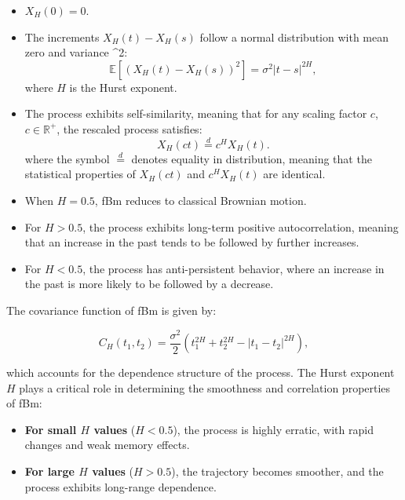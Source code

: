 \documentclass[11pt]{extarticle}
\begin{document}
\begin{itemize}
    \item \( X_H(0) = 0 \).
    \item The increments \( X_H(t) - X_H(s) \) follow a normal distribution with mean zero and variance \sigma^2:
    \begin{equation}
        \mathbb{E} \left[ (X_H(t) - X_H(s))^2 \right] = \sigma^2|t - s|^{2H},
    \end{equation}
    where \( H \) is the Hurst exponent.
    \item The process exhibits self-similarity, meaning that for any scaling factor \( c \), \( c \in \mathbb{R}^+ \), the rescaled process satisfies:
    \begin{equation}
        X_H(ct) \overset{d}{=} c^H X_H(t).
    \end{equation}
    where the symbol \(\stackrel{d}{=}\) denotes equality in distribution, meaning that the statistical properties of \(X_H(ct)\) and \(c^H X_H(t)\) are identical.

    \item When \( H = 0.5 \), fBm reduces to classical Brownian motion.
    \item For \( H > 0.5 \), the process exhibits long-term positive autocorrelation, meaning that an increase in the past tends to be followed by further increases.
    \item For \( H < 0.5 \), the process has anti-persistent behavior, where an increase in the past is more likely to be followed by a decrease.
\end{itemize}

The covariance function of fBm is given by:

\begin{equation}
    C_H(t_1, t_2) = \frac{\sigma^2}{2} \left( t_1^{2H} + t_2^{2H} - |t_1 - t_2|^{2H} \right),
    \label{eq:fbm_covariance}
\end{equation}

which accounts for the dependence structure of the process. The Hurst exponent \( H \) plays a critical role in determining the smoothness and correlation properties of fBm:

\begin{itemize}
    \item \textbf{For small \( H \) values} (\( H < 0.5 \)), the process is highly erratic, with rapid changes and weak memory effects.
    \item \textbf{For large \( H \) values} (\( H > 0.5 \)), the trajectory becomes smoother, and the process exhibits long-range dependence.
\end{itemize}
\end{document}
